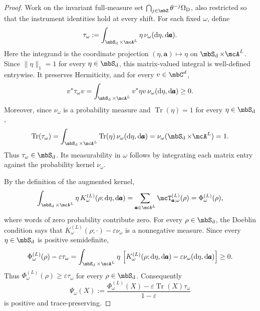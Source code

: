 \documentclass[a4paper]{article}
\numberwithin{equation}{section}   %
\theoremstyle{plain}   %
\theoremstyle{plain}   %
\theoremstyle{examplestyle}
\DeclareMathOperator{\states}{\mbS_d}   %
\newcommand{\dee}{\mathrm{d}}           %
\renewcommand{\tr}[1]{\operatorname{Tr}\left(#1\right)} %
\begin{document}
    \begin{proof}
        Work on the invariant full-measure set $\bigcap_{j\in\mbZ}\theta^{-j}\Omega_{\mathrm D}$, also restricted so that the instrument identities hold at every shift.
        For each fixed \(\omega\), define
        \[
            \tau_\omega
            :=
            \int_{\states\times\mcA^L}
                \eta\,\nu_\omega(\dee\eta,\dee\pmb a).
        \]
        Here the integrand is the coordinate projection $(\eta,\pmb a)\mapsto\eta$ on $\states\times\mcA^L$.
        Since $\|\eta\|_1=1$ for every $\eta\in\states$, this matrix-valued integral is well-defined entrywise.
        It preserves Hermiticity, and for every $v\in\mbC^d$,
        \[
            v^*\tau_\omega v
            =
            \int_{\states\times\mcA^L}
                v^*\eta v\,\nu_\omega(\dee\eta,\dee\pmb a)
            \ge0.
        \]
        Moreover, since $\nu_\omega$ is a probability measure and $\operatorname{Tr}(\eta)=1$ for every $\eta\in\states$,
        \[
            \operatorname{Tr}(\tau_\omega)
            =
            \int_{\states\times\mcA^L}
                \operatorname{Tr}(\eta)\,
                \nu_\omega(\dee\eta,\dee\pmb a)
            =
            \nu_\omega(\states\times\mcA^L)
            =1.
        \]
        Thus $\tau_\omega\in\states$.
        Its measurability in $\omega$ follows by integrating each matrix entry against the probability kernel $\nu_\omega$.

        By the definition of the augmented kernel,
        \[
            \int_{\states\times\mcA^L}
                \eta\,K^{(L)}_\omega
                (\rho;\dee\eta,\dee\pmb a)
            =
            \sum_{\pmb a\in\mcA^L}
                \mcT^{(L)}_{\pmb a;\omega}(\rho)
            =
            \Phi^{(L)}_\omega(\rho),
        \]
        where words of zero probability contribute zero.
        For every \(\rho\in\states\), the Doeblin condition says that \(K^{(L)}_\omega(\rho;\cdot)-\varepsilon\nu_\omega\)  is a nonnegative measure.
        Since every \(\eta\in\states\) is positive semidefinite,
        \[
            \Phi^{(L)}_\omega(\rho)-\varepsilon\tau_\omega
            =
            \int_{\states\times\mcA^L}
                \eta\,
                \left[
                    K^{(L)}_\omega(\rho;\dee\eta,\dee\pmb a)
                    -\varepsilon\nu_\omega(\dee\eta,\dee\pmb a)
                \right]
            \ge0.
        \]
        Thus \(\Phi^{(L)}_\omega(\rho)\ge\varepsilon\tau_\omega\) for every \(\rho\in\states\).
        Consequently
        \[
             \Psi_\omega(X):=
             \frac{\Phi^{(L)}_\omega(X)-\varepsilon\tr{X}\tau_\omega}{1-\varepsilon}
        \]
        is positive and trace-preserving.


\end{proof}
\end{document}
